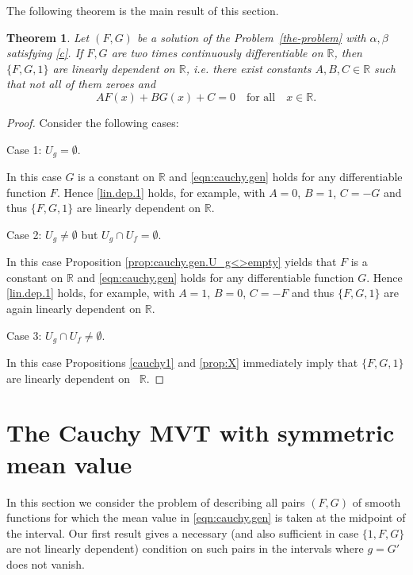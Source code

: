 \documentclass{birkjour}
\newtheorem{theorem}{Theorem}
\begin{document}
The following theorem is the main result of this section.
\begin{theorem} 
\label{thcauchy1}
Let $(F,G)$ be a solution of the Problem~\ref{the-problem} with $\alpha,\beta$ satisfying \eqref{c}. If $F,G$ are two times continuously differentiable on ${{\mathbb R}}$, then $\{F, G, 1\}$ are linearly dependent on ${{\mathbb R}}$, i.e. there exist constants $A,B,C\in{{\mathbb R}}$ such that not all of them zeroes and 
\begin{equation}\label{lin.dep.1}
AF(x)+BG(x)+C=0 \quad \text{for all} \quad x\in{{\mathbb R}}.
\end{equation}
\end{theorem}
\begin{proof}
Consider the following cases:

\smallskip
\noindent
Case 1: $U_g = \emptyset$.

In this case $G$ is a constant on ${{\mathbb R}}$ and \eqref{eqn:cauchy.gen} holds for any differentiable function $F$. Hence \eqref{lin.dep.1} holds, for example, with $A=0$, $B=1$, $C=-G$ and thus $\{F, G, 1\}$ are linearly dependent on ${{\mathbb R}}$.

\smallskip
\noindent
Case 2: $U_g \neq \emptyset$ but $U_g \cap U_f=\emptyset$.

In this case Proposition \ref{prop:cauchy.gen.U_g<>empty} yields that $F$ is a constant on ${{\mathbb R}}$ and \eqref{eqn:cauchy.gen} holds for any differentiable function $G$. Hence \eqref{lin.dep.1} holds, for example, with $A=1$, $B=0$, $C=-F$ and thus $\{F, G, 1\}$ are again linearly dependent on ${{\mathbb R}}$.

\smallskip
\noindent
Case 3: $U_g \cap U_f \neq \emptyset$.

In this case Propositions \ref{cauchy1} and \ref{prop:X} immediately imply that $\{F, G, 1\}$ are linearly dependent on ~${{\mathbb R}}$.
\end{proof}
\section{The Cauchy MVT with symmetric mean value} 

In this section we consider the problem of describing all pairs $(F,G)$ of smooth functions for which the mean value in \eqref{eqn:cauchy.gen} is taken at the midpoint of the interval. Our first result gives a necessary (and also sufficient in case $\{1,F,G\}$ are not linearly dependent) condition on such pairs in the intervals where $g=G'$ does not vanish.
\end{document}
